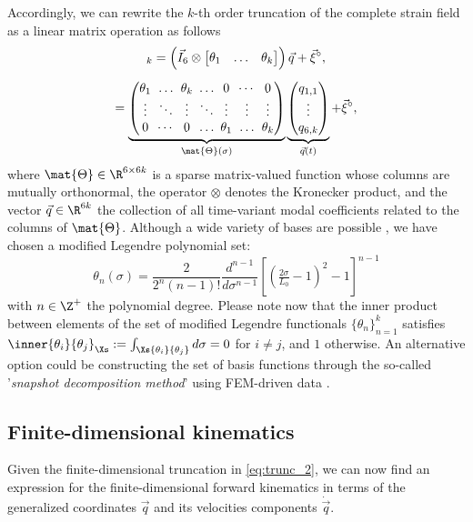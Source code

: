 \noindent Accordingly, we can rewrite the $k$-th order truncation of the complete strain field as a linear matrix operation as follows
%
\begin{multline}
[\vec{\xi}]_k  = \left(\vec{I}_6  \otimes \begin{bmatrix} \theta_1 & \hdots & \theta_k \end{bmatrix} \right) \vec{q} + \vec{\xi}^\circ,  \\[0.5em]
 =
\begingroup %
\setlength\arraycolsep{2.5pt}
\underbrace{\begin{pmatrix}
\theta_1 & \hdots & \theta_k & \hdots & 0 & \cdots&  0 \\
\vdots & \ddots & \vdots & \ddots & \vdots & \vdots & \vdots \\
0 & \cdots&  0 & \hdots & \theta_1 & \hdots & \theta_k\end{pmatrix}}_{{\mat{\Theta}(\sigma)}}
\endgroup
\underbrace{\begin{pmatrix} q_{1,1} \\ \vdots \\ q_{6,k}\end{pmatrix}}_{\vec{q}(t)} + \vec{\xi}^\circ,
\label{eq:trunc_2}
\end{multline}
%
where $\mat{\Theta} \in \R^{6 \times 6k}$ is a sparse matrix-valued function whose columns are mutually orthonormal, the operator $\otimes$ denotes the Kronecker product, and the vector $\vec{q} \in \R^{6k}$ the collection of all time-variant modal coefficients related to the columns of $\mat{\Theta}$. Although a wide variety of bases are possible \cite{Boyer2021,Santina2020}, we have chosen a modified Legendre polynomial set:
%
\begin{equation}
\theta_n(\sigma) = \frac{2}{2^{n}(n-1)!} \frac{d^{n-1}}{d\sigma^{n-1}}\left[\left( \tfrac{2\sigma}{L_0}-1 \right)^2 -1 \right]^{n-1}
\end{equation}
%
with $n \in \Z^+$ the polynomial degree. Please note now that the inner product between elements of the set of modified Legendre functionals $\{\theta_n\}_{n = 1}^k$ satisfies $\inner{\theta_i}{\theta_j}_{\Xs} := \int_\Xs{\theta_i}{\theta_j} d\sigma = 0$ for $i \neq j$, and $1$ otherwise. An alternative option could be constructing the set of basis functions through the so-called '\textit{snapshot decomposition method}' using FEM-driven data \cite{Astrid2008,Duriez2013,Largilliere2015}.

\subsection{Finite-dimensional kinematics}
Given the finite-dimensional truncation in \eqref{eq:trunc_2}, we can now find an expression for the finite-dimensional forward kinematics in terms of the generalized coordinates $\vec{q}$ and its velocities components $\dot{\vec{q}}$.

